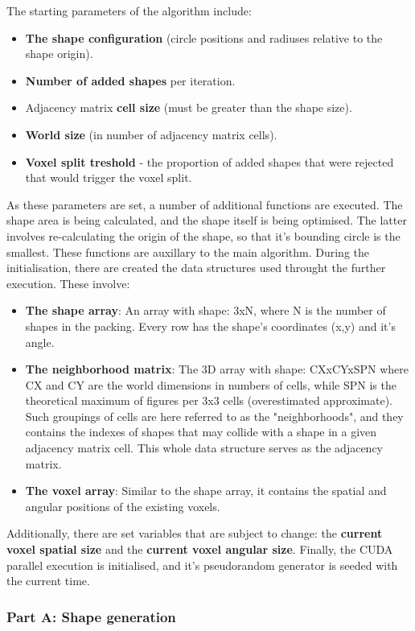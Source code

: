 \documentclass[12pt, oneside]{report}
\begin{document}
The starting parameters of the algorithm include:
\begin{itemize}
  \item \textbf{The shape configuration} (circle positions and radiuses relative to the shape origin).
  \item \textbf{Number of added shapes} per iteration.
  \item Adjacency matrix \textbf{cell size} (must be greater than the shape size).
  \item \textbf{World size} (in number of adjacency matrix cells).
	\item \textbf{Voxel split treshold} - the proportion of added shapes that were rejected that would trigger the voxel split.
\end{itemize}
As these parameters are set, a number of additional functions are executed. The shape area is being calculated, and the shape itself is being optimised. The latter involves re-calculating the origin of the shape, so that it's bounding circle is the smallest. These functions are auxillary to the main algorithm.
\newline
During the initialisation, there are created the data structures used throught the further execution. These involve:
\begin{itemize}
  \item \textbf{The shape array}: An array with shape: 3xN, where N is the number of shapes in the packing. Every row has the shape's coordinates (x,y) and it's angle.
  \item \textbf{The neighborhood matrix}: The 3D array with shape: CXxCYxSPN where CX and CY are the world dimensions in numbers of cells, while SPN is the theoretical maximum of figures per 3x3 cells (overestimated approximate). Such groupings of cells are here referred to as the "neighborhoods", and they contains the indexes of shapes that may collide with a shape in a given adjacency matrix cell. This whole data structure serves as the adjacency matrix.
  \item \textbf{The voxel array}: Similar to the shape array, it contains the spatial and angular positions of the existing voxels.
\end{itemize}
Additionally, there are set variables that are subject to change: the \textbf{current voxel spatial size} and the \textbf{current voxel angular size}.
Finally, the CUDA parallel execution is initialised, and it's pseudorandom generator is seeded with the current time.

\subsubsection{Part A: Shape generation}
\end{document}
